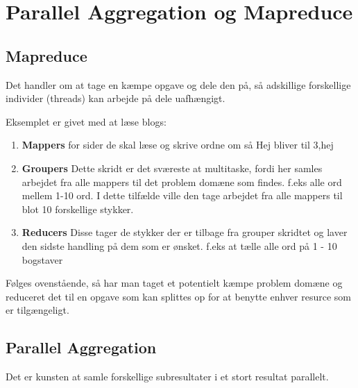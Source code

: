 \documentclass[../SWD_disp.tex]{subfiles}
\begin{document}
\section{Parallel Aggregation og Mapreduce}
\subsection{Mapreduce}
Det handler om at tage en kæmpe opgave og dele den på, så adskillige forskellige individer (threads) kan arbejde på dele uafhængigt. 

Eksemplet er givet med at læse blogs:
\begin{enumerate}
    \item \textbf{Mappers} for sider de skal læse og skrive ordne om så Hej bliver til 3,hej
    \item \textbf{Groupers} Dette skridt er det sværeste at multitaske, fordi her samles arbejdet fra alle mappers til det problem domæne som findes. f.eks alle ord mellem 1-10 ord. I dette tilfælde ville den tage arbejdet fra alle mappers til blot 10 forskellige stykker.
    \item \textbf{Reducers} Disse tager de stykker der er tilbage fra grouper skridtet og laver den sidste handling på dem som er ønsket. f.eks at tælle alle ord på 1 - 10 bogstaver
\end{enumerate}
Følges ovenstående, så har man taget et potentielt kæmpe problem domæne og reduceret det til en opgave som kan splittes op for at benytte enhver resurce som er tilgængeligt.

\subsection{Parallel Aggregation}
Det er kunsten at samle forskellige subresultater i et stort resultat parallelt. 
\end{document}
